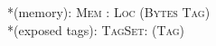 \begin{plstx}
*(memory): \mu [\in] \textsc{Mem} : \textsc{Loc} \rightarrow (\textsc{Bytes} \times \textsc{Tag}) \\
*(exposed tags): \sigma [\in] \textsc{TagSet}: (\textsc{Tag}) \\
\end{plstx}

%